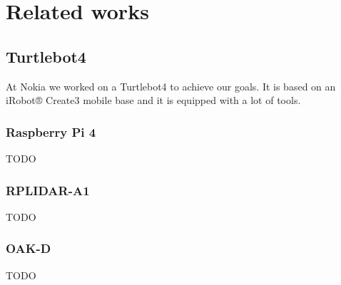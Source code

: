 \chapter{Related works}

\section{Turtlebot4}

At Nokia we worked on a Turtlebot4 to achieve our goals. It is based on an iRobot® Create3 mobile base and it is equipped with a lot of tools.

\subsection{Raspberry Pi 4}

TODO

\subsection{RPLIDAR-A1}

TODO

\subsection{OAK-D}

TODO
